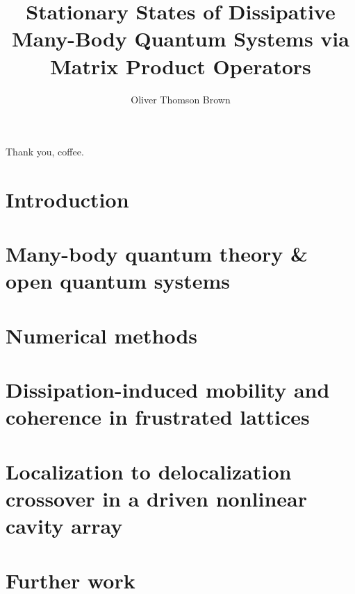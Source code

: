 \documentclass[a4paper,oneside,12pt]{hwthesis}
\author{Oliver Thomson Brown}
\title{Stationary States of Dissipative Many-Body Quantum Systems via Matrix Product Operators}
\newcommand*{\chappath}{../../include/chapters}
\begin{document}
\maketitle


\begin{acknowledgements}
Thank you, coffee.
\end{acknowledgements}

\begin{abstract}

\end{abstract}

\tableofcontents

\chapter{Introduction}
\setcounter{page}{1}



\chapter[MBQT \& OQS]{\label{chp:MBQOQS}Many-body quantum theory \& open quantum systems}



\chapter{\label{chp:NM}Numerical methods}



\chapter[Frustrated lattices]{\label{chp:DIM}Dissipation-induced mobility and coherence in frustrated lattices}



\chapter[Driven nonlinear cavity array]{\label{chp:DNLCA}Localization to delocalization crossover in a driven nonlinear cavity array}



\chapter{\label{chp:FW}Further work}
\end{document}
